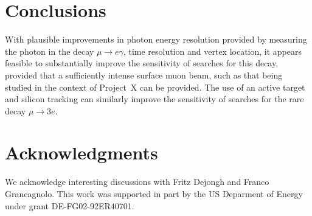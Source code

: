 \section{Conclusions}
\label{conclusions}

With plausible improvements in photon energy resolution provided by measuring the photon in the decay $\mu \to e \gamma$, time resolution and vertex location, it appears feasible to substantially improve the sensitivity of searches for this decay, provided that a sufficiently intense surface muon beam, such as that being studied in the context of Project~X can be provided. The use of an active target and silicon tracking can similarly improve the sensitivity of searches for the rare decay $\mu \to 3e$.

\section{Acknowledgments}
\label{ack}

We acknowledge interesting discussions with Fritz Dejongh and Franco Grancagnolo.
This work was supported in part by the US Deparment of Energy under grant DE-FG02-92ER40701.

